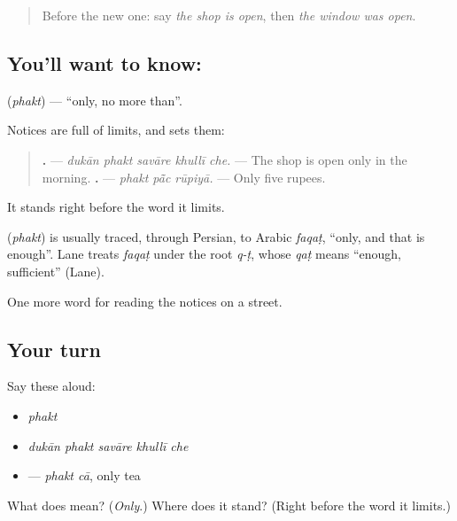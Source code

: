 \label{lesson:GU-C151-phakt}



\begin{quote}
Before the new one: say \emph{the shop is open}, then \emph{the window was open}.
\end{quote}

\subsection*{You'll want to know: }
\textbf{} (\emph{phakt}) — \textquotedblleft{}only, no more than\textquotedblright{}.

Notices are full of limits, and \textbf{} sets them:

\begin{quote}
\textbf{    .} — \emph{dukān phakt savāre khullī che.} — The shop is open only in the morning. \textbf{  .} — \emph{phakt pā̃c rūpiyā.} — Only five rupees.
\end{quote}

It stands right before the word it limits.

\begin{cousinweb}
\textbf{} (\emph{phakt}) is usually traced, through Persian, to Arabic \emph{faqaṭ}, \textquotedblleft{}only, and that is enough\textquotedblright{}. Lane treats \emph{faqaṭ} under the root \emph{q-ṭ}, whose \emph{qaṭ} means \textquotedblleft{}enough, sufficient\textquotedblright{} (Lane).
\end{cousinweb}

\begin{grammarlens}[title={What you've built}]
One more word for reading the notices on a street.
\end{grammarlens}

\subsection*{Your turn}
Say these aloud:

\begin{itemize}
\raggedright
  \item \emph{phakt}
  \item \emph{dukān phakt savāre khullī che}
  \item \textbf{ } — \emph{phakt cā}, only tea
\end{itemize}

\begin{tcolorbox}[breakable,colback=teal!4,colframe=teal!35!black,title={Before you move on}]
What does \textbf{} mean? (\emph{Only}.) Where does it stand? (Right before the word it limits.)
\end{tcolorbox}
